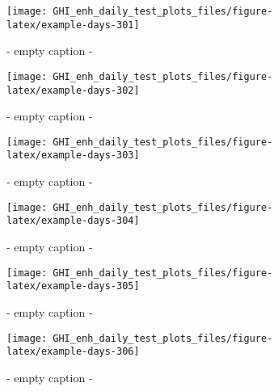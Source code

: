 \documentclass[
  10pt,
  a4paper,oneside]{article}
\begin{document}
\begin{figure}[H]

{\centering \texttt{[image: GHI\_enh\_daily\_test\_plots\_files/figure-latex/example-days-301]} 

}

\caption{ - empty caption - }\label{fig:example-days-301}
\end{figure}

\begin{figure}[H]

{\centering \texttt{[image: GHI\_enh\_daily\_test\_plots\_files/figure-latex/example-days-302]} 

}

\caption{ - empty caption - }\label{fig:example-days-302}
\end{figure}

\begin{figure}[H]

{\centering \texttt{[image: GHI\_enh\_daily\_test\_plots\_files/figure-latex/example-days-303]} 

}

\caption{ - empty caption - }\label{fig:example-days-303}
\end{figure}

\begin{figure}[H]

{\centering \texttt{[image: GHI\_enh\_daily\_test\_plots\_files/figure-latex/example-days-304]} 

}

\caption{ - empty caption - }\label{fig:example-days-304}
\end{figure}

\begin{figure}[H]

{\centering \texttt{[image: GHI\_enh\_daily\_test\_plots\_files/figure-latex/example-days-305]} 

}

\caption{ - empty caption - }\label{fig:example-days-305}
\end{figure}

\begin{figure}[H]

{\centering \texttt{[image: GHI\_enh\_daily\_test\_plots\_files/figure-latex/example-days-306]} 

}

\caption{ - empty caption - }\label{fig:example-days-306}
\end{figure}
\end{document}
